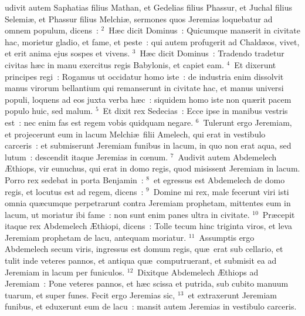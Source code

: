 \bchapter
{}udivit autem Saphatias filius Mathan, et Gedelias filius Phassur, et Juchal filius Selemi\ae , et Phassur filius Melchi\ae , sermones quos Jeremias loquebatur ad omnem populum, dicens~:
${}^{2}$~H\ae c dicit Dominus~: Quicumque manserit in civitate hac, morietur gladio, et fame, et peste~: qui autem profugerit ad Chald\ae os, vivet, et erit anima ejus sospes et vivens.
${}^{3}$~H\ae c dicit Dominus~: Tradendo tradetur civitas h\ae c in manu exercitus regis Babylonis, et capiet eam.
${}^{4}$~Et dixerunt principes regi~: Rogamus ut occidatur homo iste~: de industria enim dissolvit manus virorum bellantium qui remanserunt in civitate hac, et manus universi populi, loquens ad eos juxta verba h\ae c~: siquidem homo iste non qu\ae rit pacem populo huic, sed malum.
${}^{5}$~Et dixit rex Sedecias~: Ecce ipse in manibus vestris est~: nec enim fas est regem vobis quidquam negare.
${}^{6}$~Tulerunt ergo Jeremiam, et projecerunt eum in lacum Melchi\ae\ filii Amelech, qui erat in vestibulo carceris~: et submiserunt Jeremiam funibus in lacum, in quo non erat aqua, sed lutum~: descendit itaque Jeremias in cœnum.
${}^{7}$~Audivit autem Abdemelech \AE thiops, vir eunuchus, qui erat in domo regis, quod misissent Jeremiam in lacum. Porro rex sedebat in porta Benjamin~:
${}^{8}$~et egressus est Abdemelech de domo regis, et locutus est ad regem, dicens~:
${}^{9}$~Domine mi rex, male fecerunt viri isti omnia qu\ae cumque perpetrarunt contra Jeremiam prophetam, mittentes eum in lacum, ut moriatur ibi fame~: non sunt enim panes ultra in civitate.
${}^{10}$~Pr\ae cepit itaque rex Abdemelech \AE thiopi, dicens~: Tolle tecum hinc triginta viros, et leva Jeremiam prophetam de lacu, antequam moriatur.
${}^{11}$~Assumptis ergo Abdemelech secum viris, ingressus est domum regis, qu\ae\ erat sub cellario, et tulit inde veteres pannos, et antiqua qu\ae\ computruerant, et submisit ea ad Jeremiam in lacum per funiculos.
${}^{12}$~Dixitque Abdemelech \AE thiops ad Jeremiam~: Pone veteres pannos, et h\ae c scissa et putrida, sub cubito manuum tuarum, et super funes. Fecit ergo Jeremias sic,
${}^{13}$~et extraxerunt Jeremiam funibus, et eduxerunt eum de lacu~: mansit autem Jeremias in vestibulo carceris.



